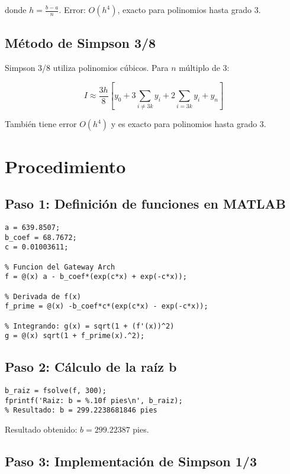 \documentclass[conference]{IEEEtran}
\begin{document}
donde $h = \frac{b-a}{n}$. Error: $O(h^4)$, exacto para polinomios hasta grado 3.

\subsection{Método de Simpson 3/8}

Simpson 3/8 utiliza polinomios cúbicos. Para $n$ múltiplo de 3:

\begin{equation}
I \approx \frac{3h}{8}\left[y_0 + 3\sum_{i\neq 3k}y_i + 2\sum_{i=3k}y_i + y_n\right]
\end{equation}

También tiene error $O(h^4)$ y es exacto para polinomios hasta grado 3.

\section{Procedimiento}

\subsection{Paso 1: Definición de funciones en MATLAB}

\begin{lstlisting}[caption={Definición de constantes y funciones}]
% Constantes del Gateway Arch
a = 639.8507;
b_coef = 68.7672;
c = 0.01003611;

% Funcion del Gateway Arch
f = @(x) a - b_coef*(exp(c*x) + exp(-c*x));

% Derivada de f(x)
f_prime = @(x) -b_coef*c*(exp(c*x) - exp(-c*x));

% Integrando: g(x) = sqrt(1 + (f'(x))^2)
g = @(x) sqrt(1 + f_prime(x).^2);
\end{lstlisting}

\subsection{Paso 2: Cálculo de la raíz b}

\begin{lstlisting}[caption={Encontrar la raíz donde f(x) = 0}]
% Usar fsolve con valor inicial x0=300
b_raiz = fsolve(f, 300);
fprintf('Raiz: b = %.10f pies\n', b_raiz);
% Resultado: b = 299.2238681846 pies
\end{lstlisting}

Resultado obtenido: $b = 299.22387$ pies.

\subsection{Paso 3: Implementación de Simpson 1/3}
\end{document}

